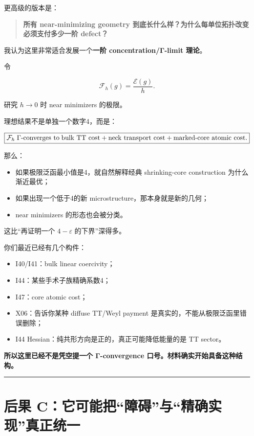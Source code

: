 \documentclass[
  10pt,
]{article}
\providecommand{\tightlist}{%
  \setlength{\itemsep}{0pt}\setlength{\parskip}{0pt}}
\begin{document}
更高级的版本是：

\begin{quote}
\textbf{所有 near-minimizing geometry
到底长什么样？为什么每单位拓扑改变必须支付多少一阶 defect？}
\end{quote}

我认为这里非常适合发展一个\textbf{一阶 concentration/Γ-limit 理论}。

令

\[
\mathcal F_h(g)=\frac{\mathcal E(g)}h.
\]

研究 \(h\to0\) 时 near minimizers 的极限。

理想结果不是单独一个数字4，而是：

\[
\boxed{
\mathcal F_h
\;\Gamma\hbox{-converges to}\;
\text{bulk TT cost}
+
\text{neck transport cost}
+
\text{marked-core atomic cost}.
}
\]

那么：

\begin{itemize}
\tightlist
\item
  如果极限泛函最小值是4，就自然解释经典 shrinking-core construction
  为什么渐近最优；
\item
  如果出现一个低于4的新 microstructure，那本身就是新的几何；
\item
  near minimizers 的形态也会被分类。
\end{itemize}

这比``再证明一个 \(4-\varepsilon\) 的下界''深得多。

你们最近已经有几个构件：

\begin{itemize}
\tightlist
\item
  I40/I41：bulk linear coercivity；
\item
  I44：某些手术子族精确系数4；
\item
  I47：core atomic cost；
\item
  X06：告诉你某种 diffuse TT/Weyl payment
  是真实的，不能从极限泛函里错误删除；
\item
  I44 Hessian：纯共形方向是正的，真正可能降低能量的是 TT sector。
\end{itemize}

\textbf{所以这里已经不是凭空提一个 Γ-convergence
口号。材料确实开始具备这种结构。}

\begin{center}\rule{0.5\linewidth}{0.5pt}\end{center}

\hypertarget{ux540eux679c-cux5b83ux53efux80fdux628aux969cux788dux4e0eux7cbeux786eux5b9eux73b0ux771fux6b63ux7edfux4e00}{%
\section{后果
C：它可能把``障碍''与``精确实现''真正统一}\label{ux540eux679c-cux5b83ux53efux80fdux628aux969cux788dux4e0eux7cbeux786eux5b9eux73b0ux771fux6b63ux7edfux4e00}}
\end{document}
